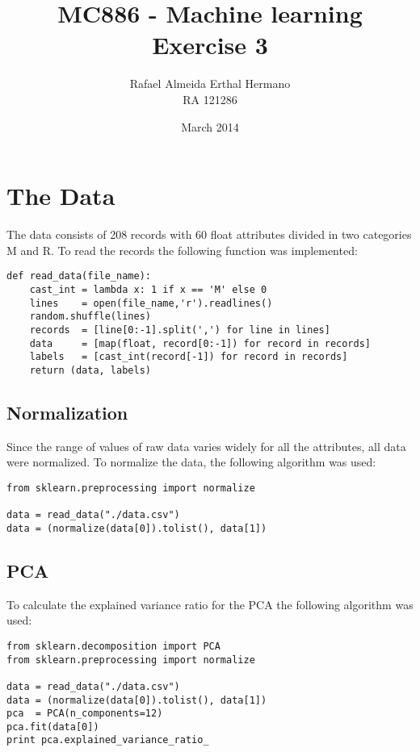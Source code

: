 \documentclass{article}
\title{MC886 - Machine learning \\ Exercise 3}
\author{Rafael Almeida Erthal Hermano\\RA 121286}
\date{March 2014}
\begin{document}
\maketitle
\newpage

\section{The Data}
The data consists of 208 records with 60 float attributes divided in two categories M and R. To read the records the following function was implemented:

\begin{lstlisting}
def read_data(file_name):
    cast_int = lambda x: 1 if x == 'M' else 0
    lines    = open(file_name,'r').readlines()
    random.shuffle(lines)
    records  = [line[0:-1].split(',') for line in lines]
    data     = [map(float, record[0:-1]) for record in records]
    labels   = [cast_int(record[-1]) for record in records]
    return (data, labels)
\end{lstlisting}

\subsection{Normalization}
Since the range of values of raw data varies widely for all the attributes, all data were normalized. To normalize the data, the following algorithm was used:

\begin{lstlisting}
from sklearn.preprocessing import normalize

data = read_data("./data.csv")
data = (normalize(data[0]).tolist(), data[1])
\end{lstlisting}

\subsection{PCA}
To calculate the explained variance ratio for the PCA the following algorithm was used:

\begin{lstlisting}
from sklearn.decomposition import PCA
from sklearn.preprocessing import normalize

data = read_data("./data.csv")
data = (normalize(data[0]).tolist(), data[1])
pca  = PCA(n_components=12)
pca.fit(data[0])
print pca.explained_variance_ratio_
\end{lstlisting}

\newpage
\end{document}
